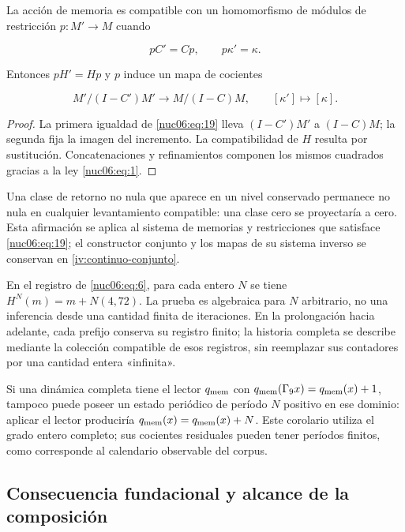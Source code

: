 La acción de memoria es compatible con un homomorfismo de módulos de restricción \(p:M'\to M\) cuando

\begin{equation}
pC'=Cp,\qquad p\kappa'=\kappa.
\label{nuc06:eq:19}
\end{equation}

Entonces \(pH'=Hp\) y \(p\) induce un mapa de cocientes

\begin{equation}
M'/(I-C')M'\longrightarrow M/(I-C)M,
\qquad [\kappa']\longmapsto[\kappa].
\label{nuc06:eq:20}
\end{equation}

\begin{proof}
La primera igualdad de \eqref{nuc06:eq:19} lleva \((I-C')M'\) a \((I-C)M\); la segunda fija la imagen del incremento. La compatibilidad de \(H\) resulta por sustitución. Concatenaciones y refinamientos componen los mismos cuadrados gracias a la ley \eqref{nuc06:eq:1}.
\end{proof}

Una clase de retorno no nula que aparece en un nivel conservado permanece no nula en cualquier levantamiento compatible: una clase cero se proyectaría a cero. Esta afirmación se aplica al sistema de memorias y restricciones que satisface \eqref{nuc06:eq:19}; el constructor conjunto y los mapas de su sistema inverso se conservan en \cref{iv:continuo-conjunto}.

En el registro de \eqref{nuc06:eq:6}, para cada entero \(N\) se tiene \(H^N(m)=m+N(4,72)\). La prueba es algebraica para \(N\) arbitrario, no una inferencia desde una cantidad finita de iteraciones. En la prolongación hacia adelante, cada prefijo conserva su registro finito; la historia completa se describe mediante la colección compatible de esos registros, sin reemplazar sus contadores por una cantidad entera «infinita».

Si una dinámica completa tiene el lector \(q_{\rm mem}\) con \(q_{\rm mem}(\Gamma_9x)=q_{\rm mem}(x)+1\), tampoco puede poseer un estado periódico de período \(N\) positivo en ese dominio: aplicar el lector produciría \(q_{\rm mem}(x)=q_{\rm mem}(x)+N\). Este corolario utiliza el grado entero completo; sus cocientes residuales pueden tener períodos finitos, como corresponde al calendario observable del corpus.

\subsection{Consecuencia fundacional y alcance de la composición}

